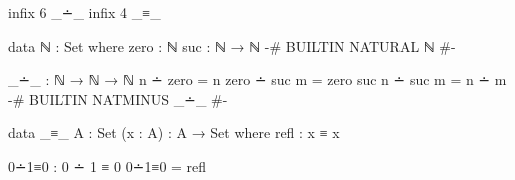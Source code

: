 \documentclass{article}
\begin{document}
\begin{prev}
\begin{code}
infix 6 _∸_
infix 4 _≡_

data ℕ : Set where
  zero : ℕ
  suc  : ℕ → ℕ
{-# BUILTIN NATURAL ℕ #-}

_∸_ : ℕ → ℕ → ℕ
n ∸ zero = n
zero ∸ suc m = zero
suc n ∸ suc m = n ∸ m
{-# BUILTIN NATMINUS _∸_ #-}

data _≡_ {A : Set} (x : A) : A → Set where
  refl : x ≡ x

0∸1≡0 : 0 ∸ 1 ≡ 0
0∸1≡0 = refl
\end{code}
\end{prev}
\end{document}
